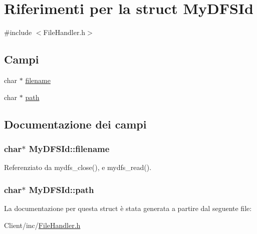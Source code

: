 \hypertarget{structMyDFSId}{}\section{Riferimenti per la struct My\+D\+F\+S\+Id}
\label{structMyDFSId}


{\ttfamily \#include $<$File\+Handler.\+h$>$}

\subsection*{Campi}
\begin{DoxyCompactItemize}
\item 
char $\ast$ \hyperlink{structMyDFSId_ac0e1b8c96d859982c1a7d49f9e929e48}{filename}
\item 
char $\ast$ \hyperlink{structMyDFSId_ada22c15c99f564f9bfbe95d0d28913c2}{path}
\end{DoxyCompactItemize}


\subsection{Documentazione dei campi}
\hypertarget{structMyDFSId_ac0e1b8c96d859982c1a7d49f9e929e48}{}
\subsubsection[{filename}]{\setlength{\rightskip}{0pt plus 5cm}char$\ast$ My\+D\+F\+S\+Id\+::filename}\label{structMyDFSId_ac0e1b8c96d859982c1a7d49f9e929e48}


Referenziato da mydfs\+\_\+close(), e mydfs\+\_\+read().

\hypertarget{structMyDFSId_ada22c15c99f564f9bfbe95d0d28913c2}{}
\subsubsection[{path}]{\setlength{\rightskip}{0pt plus 5cm}char$\ast$ My\+D\+F\+S\+Id\+::path}\label{structMyDFSId_ada22c15c99f564f9bfbe95d0d28913c2}


La documentazione per questa struct è stata generata a partire dal seguente file\+:\begin{DoxyCompactItemize}
\item 
Client/inc/\hyperlink{FileHandler_8h}{File\+Handler.\+h}\end{DoxyCompactItemize}
